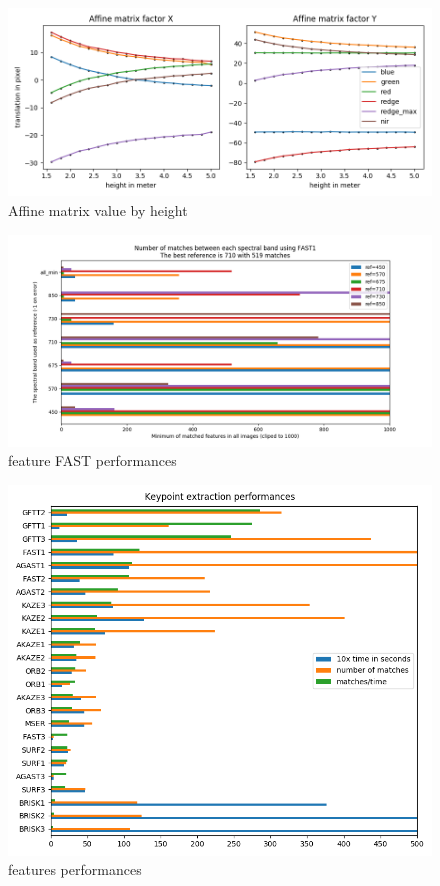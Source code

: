 \documentclass[]{elsarticle}
\begin{document}
	\begin{figure}[H]
		\centering
		\includegraphics[width=0.6\linewidth]{../figures/affine-translation-height.png}
		\caption{Affine matrix value by height}
		\label{fig:affine-translation-height}
	\end{figure}
	
	\begin{figure}[H]
		\centering
		\includegraphics[width=0.7\linewidth]{../figures/comparaison-keypoint-matching-reference-FAST1.png}
		\caption{feature FAST performances}
		\label{fig:features-FAST-performances}
	\end{figure}

	\begin{figure}[H]
		\centering
		\includegraphics[width=0.7\linewidth]{../figures/comparaison-keypoint-performances.png}
		\caption{features performances}
		\label{fig:features-performances}
	\end{figure}
\end{document}
